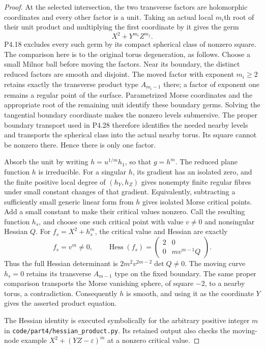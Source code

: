 \begin{proof}
At the selected intersection, the two transverse factors
are holomorphic coordinates and every other factor is a
unit. Taking an actual local $m_i$th root of their unit
product and multiplying the first coordinate by it gives
the germ
\[
                        X^2+Y^{m_i}Z^{m_j}.
\]
P4.18 excludes every such germ by its compact spherical
class of nonzero square. The comparison here is to the
original torus degeneration, as follows. Choose a small
Milnor ball before moving the factors. Near its boundary,
the distinct reduced factors are smooth and disjoint.
The moved factor with exponent $m_i\ge2$ retains exactly
the transverse product type $A_{m_i-1}$ there; a factor
of exponent one remains a regular point of the surface.
Parametrized Morse coordinates and the appropriate root
of the remaining unit identify these boundary germs.
Solving the tangential boundary coordinate makes the
nonzero levels submersive. The proper boundary transport
used in P4.28 therefore identifies the needed nearby
levels and transports the spherical class into the actual
nearby torus. Its square cannot be nonzero there. Hence
there is only one factor.

Absorb the unit by writing $h=u^{1/m}h_1$, so that
$g=h^m$. The reduced plane function $h$ is irreducible.
For a singular $h$, its gradient has an isolated zero,
and the finite positive local degree of
$(h_Y,h_Z)$ gives nonempty finite regular fibres under
small constant changes of that gradient. Equivalently,
subtracting a sufficiently small generic linear form
from $h$ gives isolated Morse critical points. Add a
small constant to make their critical values nonzero.
Call the resulting function $h_s$, and choose one such
critical point with value $v\ne0$ and nonsingular Hessian
$Q$. For $f_s=X^2+h_s^m$, the critical value and Hessian
are exactly
\[
 f_s=v^m\ne0,\qquad
 \operatorname{Hess}(f_s)
   =\begin{pmatrix}2&0\\0&m v^{m-1}Q\end{pmatrix}.
\]
Thus the full Hessian determinant is
$2m^2v^{2m-2}\det Q\ne0$. The moving curve $h_s=0$
retains its transverse $A_{m-1}$ type on the fixed
boundary. The same proper comparison transports the
Morse vanishing sphere, of square $-2$, to a nearby
torus, a contradiction. Consequently $h$ is smooth,
and using it as the coordinate $Y$ gives the asserted
product equation.

The Hessian identity is executed symbolically for the
arbitrary positive integer $m$ in
\texttt{code/part4/hessian\_product.py}. Its retained
output also checks the moving-node example
$X^2+(YZ-\varepsilon)^m$ at a nonzero critical value.
\end{proof}
